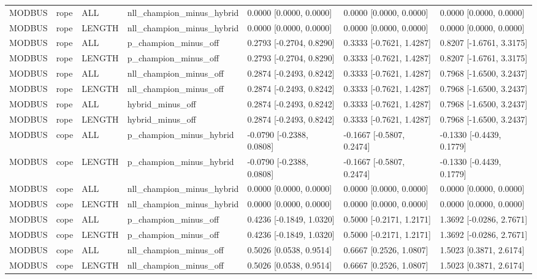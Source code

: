 \begin{tabular}{lllllll}
MODBUS & rope & ALL & nll\_champion\_minus\_hybrid & 0.0000 [0.0000, 0.0000] & 0.0000 [0.0000, 0.0000] & 0.0000 [0.0000, 0.0000] \\
MODBUS & rope & LENGTH & nll\_champion\_minus\_hybrid & 0.0000 [0.0000, 0.0000] & 0.0000 [0.0000, 0.0000] & 0.0000 [0.0000, 0.0000] \\
MODBUS & rope & ALL & p\_champion\_minus\_off & 0.2793 [-0.2704, 0.8290] & 0.3333 [-0.7621, 1.4287] & 0.8207 [-1.6761, 3.3175] \\
MODBUS & rope & LENGTH & p\_champion\_minus\_off & 0.2793 [-0.2704, 0.8290] & 0.3333 [-0.7621, 1.4287] & 0.8207 [-1.6761, 3.3175] \\
MODBUS & rope & ALL & nll\_champion\_minus\_off & 0.2874 [-0.2493, 0.8242] & 0.3333 [-0.7621, 1.4287] & 0.7968 [-1.6500, 3.2437] \\
MODBUS & rope & LENGTH & nll\_champion\_minus\_off & 0.2874 [-0.2493, 0.8242] & 0.3333 [-0.7621, 1.4287] & 0.7968 [-1.6500, 3.2437] \\
MODBUS & rope & ALL & hybrid\_minus\_off & 0.2874 [-0.2493, 0.8242] & 0.3333 [-0.7621, 1.4287] & 0.7968 [-1.6500, 3.2437] \\
MODBUS & rope & LENGTH & hybrid\_minus\_off & 0.2874 [-0.2493, 0.8242] & 0.3333 [-0.7621, 1.4287] & 0.7968 [-1.6500, 3.2437] \\
MODBUS & cope & ALL & p\_champion\_minus\_hybrid & -0.0790 [-0.2388, 0.0808] & -0.1667 [-0.5807, 0.2474] & -0.1330 [-0.4439, 0.1779] \\
MODBUS & cope & LENGTH & p\_champion\_minus\_hybrid & -0.0790 [-0.2388, 0.0808] & -0.1667 [-0.5807, 0.2474] & -0.1330 [-0.4439, 0.1779] \\
MODBUS & cope & ALL & nll\_champion\_minus\_hybrid & 0.0000 [0.0000, 0.0000] & 0.0000 [0.0000, 0.0000] & 0.0000 [0.0000, 0.0000] \\
MODBUS & cope & LENGTH & nll\_champion\_minus\_hybrid & 0.0000 [0.0000, 0.0000] & 0.0000 [0.0000, 0.0000] & 0.0000 [0.0000, 0.0000] \\
MODBUS & cope & ALL & p\_champion\_minus\_off & 0.4236 [-0.1849, 1.0320] & 0.5000 [-0.2171, 1.2171] & 1.3692 [-0.0286, 2.7671] \\
MODBUS & cope & LENGTH & p\_champion\_minus\_off & 0.4236 [-0.1849, 1.0320] & 0.5000 [-0.2171, 1.2171] & 1.3692 [-0.0286, 2.7671] \\
MODBUS & cope & ALL & nll\_champion\_minus\_off & 0.5026 [0.0538, 0.9514] & 0.6667 [0.2526, 1.0807] & 1.5023 [0.3871, 2.6174] \\
MODBUS & cope & LENGTH & nll\_champion\_minus\_off & 0.5026 [0.0538, 0.9514] & 0.6667 [0.2526, 1.0807] & 1.5023 [0.3871, 2.6174] \\

\end{tabular}
